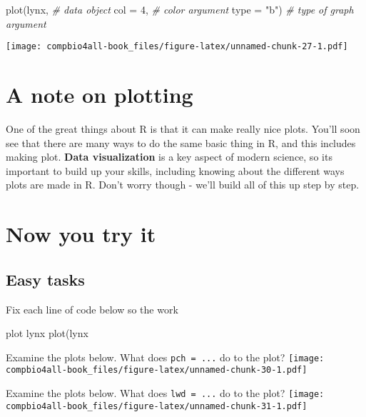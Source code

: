 \documentclass[
]{book}
\newenvironment{Shaded}{\begin{snugshade}}{\end{snugshade}}
\newcommand{\AttributeTok}[1]{\textcolor[rgb]{0.77,0.63,0.00}{#1}}
\newcommand{\CommentTok}[1]{\textcolor[rgb]{0.56,0.35,0.01}{\textit{#1}}}
\newcommand{\DecValTok}[1]{\textcolor[rgb]{0.00,0.00,0.81}{#1}}
\newcommand{\FunctionTok}[1]{\textcolor[rgb]{0.00,0.00,0.00}{#1}}
\newcommand{\NormalTok}[1]{#1}
\newcommand{\StringTok}[1]{\textcolor[rgb]{0.31,0.60,0.02}{#1}}
\begin{document}
\begin{Shaded}
\begin{Highlighting}[]
\FunctionTok{plot}\NormalTok{(lynx,          }\CommentTok{\# data object}
     \AttributeTok{col =} \DecValTok{4}\NormalTok{,       }\CommentTok{\# color argument}
     \AttributeTok{type =} \StringTok{"b"}\NormalTok{)  }\CommentTok{\# type of graph argument}
\end{Highlighting}
\end{Shaded}

\texttt{[image: compbio4all-book\_files/figure-latex/unnamed-chunk-27-1.pdf]}

\hypertarget{a-note-on-plotting}{%
\section{A note on plotting}\label{a-note-on-plotting}}

One of the great things about R is that it can make really nice plots. You'll soon see that there are many ways to do the same basic thing in R, and this includes making plot. \textbf{Data visualization} is a key aspect of modern science, so its important to build up your skills, including knowing about the different ways plots are made in R. Don't worry though - we'll build all of this up step by step.

\hypertarget{now-you-try-it}{%
\section{Now you try it}\label{now-you-try-it}}

\hypertarget{easy-tasks}{%
\subsection{Easy tasks}\label{easy-tasks}}

Fix each line of code below so the work

\begin{Shaded}
\begin{Highlighting}[]
\NormalTok{plot lynx}
\FunctionTok{plot}\NormalTok{(lynx}
\end{Highlighting}
\end{Shaded}

Examine the plots below. What does \texttt{pch\ =\ ...} do to the plot?
\texttt{[image: compbio4all-book\_files/figure-latex/unnamed-chunk-30-1.pdf]}

Examine the plots below. What does \texttt{lwd\ =\ ...} do to the plot?
\texttt{[image: compbio4all-book\_files/figure-latex/unnamed-chunk-31-1.pdf]}
\end{document}
